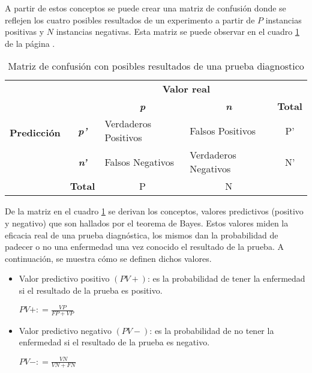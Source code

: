 \documentclass{article}
\begin{document}
A partir de estos conceptos se puede crear una matriz de confusión donde se reflejen los cuatro posibles resultados de un experimento a partir de $P$ instancias positivas y $N$ instancias negativas. Esta matriz se puede observar en el cuadro \ref{tab:mtrizconf} de la página \pageref{tab:mtrizconf}.


\begin{table}
  \centering
  \caption{Matriz de confusión con posibles resultados de una prueba diagnostico}
    \begin{tabular}{rcccr}
    \toprule
          &       & \multicolumn{2}{c}{\textbf{Valor real}} &  \\
          &       & \textit{\textbf{p}} & \textit{\textbf{n}} & \multicolumn{1}{c}{\textbf{Total}} \\
\cmidrule{3-4}          & \multicolumn{1}{c|}{\multirow{2}[2]{*}{\textit{\textbf{p'}}}} & \multicolumn{1}{l|}{\multirow{2}[2]{*}{Verdaderos Positivos}} & \multicolumn{1}{l|}{\multirow{2}[2]{*}{Falsos Positivos}} & \multicolumn{1}{c}{\multirow{2}[2]{*}{P'}} \\
    \multicolumn{1}{c}{\multirow{2}[2]{*}{\textbf{Predicción}}} & \multicolumn{1}{c|}{} & \multicolumn{1}{l|}{} & \multicolumn{1}{l|}{} &  \\
\cmidrule{3-4}          & \multicolumn{1}{c|}{\multirow{2}[2]{*}{\textit{\textbf{n'}}}} & \multicolumn{1}{l|}{\multirow{2}[2]{*}{Falsos Negativos}} & \multicolumn{1}{l|}{\multirow{2}[2]{*}{Verdaderos Negativos}} & \multicolumn{1}{c}{\multirow{2}[2]{*}{N'}} \\
          & \multicolumn{1}{c|}{} & \multicolumn{1}{l|}{} & \multicolumn{1}{l|}{} &  \\
\cmidrule{3-4}          & \textbf{Total} & P     & N     &  \\
    \bottomrule
    \end{tabular}%
  \label{tab:mtrizconf}%
\end{table}%

De la matriz en el cuadro \ref{tab:mtrizconf} se derivan los conceptos, valores predictivos (positivo y negativo) que son hallados por el teorema de Bayes. Estos valores miden la eficacia real de una prueba diagnóstica, los mismos dan la probabilidad de padecer o no una enfermedad una vez conocido el resultado de la prueba. A continuación, se muestra cómo se definen dichos valores.

\begin{itemize}
    \item Valor predictivo positivo $(PV+)$: es la probabilidad de tener la enfermedad si el resultado de la prueba es positivo.
    
    $PV+: = \frac{VP}{FP+VP}$
\end{itemize}
\begin{itemize}
    \item Valor predictivo negativo $(PV-)$: es la probabilidad de no tener la enfermedad si el resultado de la prueba es negativo.
    
    $PV-: = \frac{VN}{VN+FN}$
\end{itemize}
\end{document}
